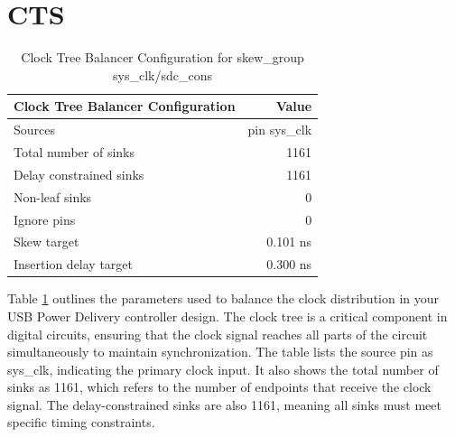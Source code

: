 
\section{CTS}
\begin{table}[H]
\centering
\caption{Clock Tree Balancer Configuration for skew\_group sys\_clk/sdc\_cons}
\begin{tabular}{|l|r|}
\hline
\textbf{Clock Tree Balancer Configuration} & \textbf{Value} \\ \hline
Sources & pin sys\_clk \\ \hline
Total number of sinks & 1161 \\ \hline
Delay constrained sinks & 1161 \\ \hline
Non-leaf sinks & 0 \\ \hline
Ignore pins & 0 \\ \hline
Skew target & 0.101 ns \\ \hline
Insertion delay target & 0.300 ns \\ \hline
\end{tabular}
\label{table:clock_tree_balancer}
\end{table}
Table \ref{table:clock_tree_balancer} outlines the parameters used to balance the clock distribution in your USB Power Delivery controller design. The clock tree is a critical component in digital circuits, ensuring that the clock signal reaches all parts of the circuit simultaneously to maintain synchronization. The table lists the source pin as sys\_clk, indicating the primary clock input. It also shows the total number of sinks as 1161, which refers to the number of endpoints that receive the clock signal. The delay-constrained sinks are also 1161, meaning all sinks must meet specific timing constraints. 

